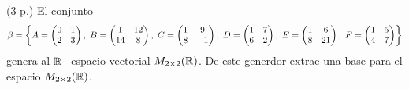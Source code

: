\begin{prob}
(3 p.) El conjunto
\[
\beta = 
\left\{
A = 
\begin{pmatrix}
0 & 1 \\
2 & 3
\end{pmatrix}, \hspace{0.1cm}
B = \begin{pmatrix}
1 & 12 \\
14 & 8
\end{pmatrix}, \hspace{0.1cm}
C = \begin{pmatrix}
1 & 9 \\
8 & -1
\end{pmatrix}, \hspace{0.1cm}
D = \begin{pmatrix}
1 & 7 \\
6 & 2
\end{pmatrix}, \hspace{0.1cm}
E = \begin{pmatrix}
1 & 6 \\
8 & 21
\end{pmatrix}, \hspace{0.1cm}
F = \begin{pmatrix}
1 & 5 \\
4 & 7
\end{pmatrix}
\right\}
\]
genera al $\mathbb{R}-$espacio vectorial 
$M_{2 \times 2}(\mathbb{R})$. De este
generdor extrae una base para el 
espacio $M_{2 \times 2}(\mathbb{R})$.
\end{prob}
